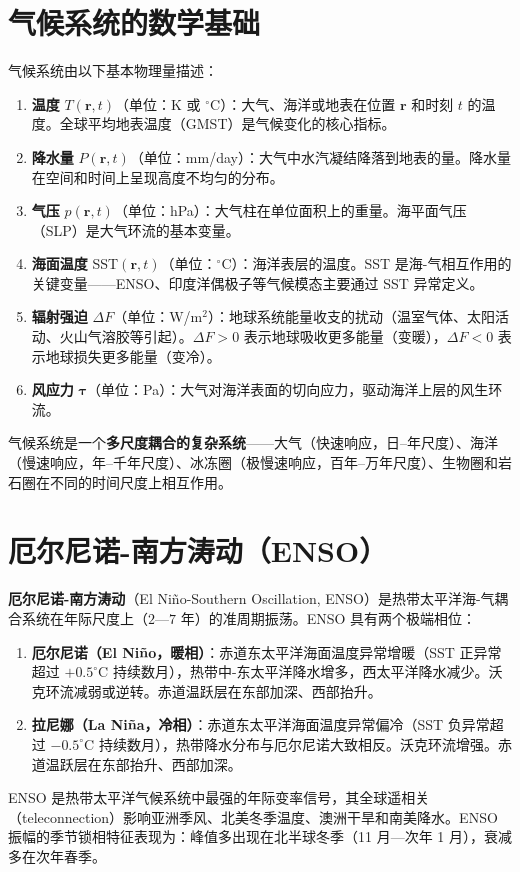 \section{气候系统的数学基础}

\begin{definition}[气候系统的基本量]\label{def:climate_quantities}
气候系统由以下基本物理量描述：
\begin{enumerate}[label=(\roman*)]
    \item \textbf{温度} $T(\mathbf{r}, t)$（单位：K 或 $^\circ$C）：大气、海洋或地表在位置 $\mathbf{r}$ 和时刻 $t$ 的温度。全球平均地表温度（GMST）是气候变化的核心指标。
    \item \textbf{降水量} $P(\mathbf{r}, t)$（单位：mm/day）：大气中水汽凝结降落到地表的量。降水量在空间和时间上呈现高度不均匀的分布。
    \item \textbf{气压} $p(\mathbf{r}, t)$（单位：hPa）：大气柱在单位面积上的重量。海平面气压（SLP）是大气环流的基本变量。
    \item \textbf{海面温度} SST$(\mathbf{r}, t)$（单位：$^\circ$C）：海洋表层的温度。SST 是海-气相互作用的关键变量——ENSO、印度洋偶极子等气候模态主要通过 SST 异常定义。
    \item \textbf{辐射强迫} $\Delta F$（单位：W/m$^2$）：地球系统能量收支的扰动（温室气体、太阳活动、火山气溶胶等引起）。$\Delta F > 0$ 表示地球吸收更多能量（变暖），$\Delta F < 0$ 表示地球损失更多能量（变冷）。
    \item \textbf{风应力} $\boldsymbol{\tau}$（单位：Pa）：大气对海洋表面的切向应力，驱动海洋上层的风生环流。
\end{enumerate}
气候系统是一个\textbf{多尺度耦合的复杂系统}——大气（快速响应，日–年尺度）、海洋（慢速响应，年–千年尺度）、冰冻圈（极慢速响应，百年–万年尺度）、生物圈和岩石圈在不同的时间尺度上相互作用。
\end{definition}

\section{厄尔尼诺-南方涛动（ENSO）}

\begin{definition}\label{def:enso}
\textbf{厄尔尼诺-南方涛动}（El Niño-Southern Oscillation, ENSO）是热带太平洋海-气耦合系统在年际尺度上（$2$—$7$ 年）的准周期振荡。ENSO 具有两个极端相位：
\begin{enumerate}[label=(\roman*)]
    \item \textbf{厄尔尼诺（El Niño，暖相）}：赤道东太平洋海面温度异常增暖（SST 正异常超过 $+0.5^\circ$C 持续数月），热带中-东太平洋降水增多，西太平洋降水减少。沃克环流减弱或逆转。赤道温跃层在东部加深、西部抬升。
    \item \textbf{拉尼娜（La Niña，冷相）}：赤道东太平洋海面温度异常偏冷（SST 负异常超过 $-0.5^\circ$C 持续数月），热带降水分布与厄尔尼诺大致相反。沃克环流增强。赤道温跃层在东部抬升、西部加深。
\end{enumerate}
ENSO 是热带太平洋气候系统中最强的年际变率信号，其全球遥相关（teleconnection）影响亚洲季风、北美冬季温度、澳洲干旱和南美降水。ENSO 振幅的季节锁相特征表现为：峰值多出现在北半球冬季（11 月—次年 1 月），衰减多在次年春季。
\end{definition}


